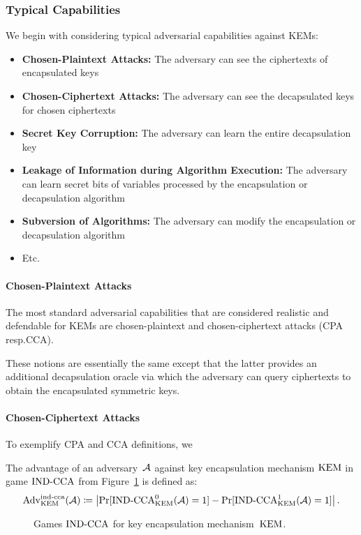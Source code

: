 \documentclass[a4paper,orivec]{llncs}
\begin{document}
\subsubsection{Typical Capabilities}
We begin with considering typical adversarial capabilities against KEMs:
\begin{itemize}
    \item \textbf{Chosen-Plaintext Attacks:}
    The adversary can see the ciphertexts of encapsulated keys
    \item \textbf{Chosen-Ciphertext Attacks:}
    The adversary can see the decapsulated keys for chosen ciphertexts
    \item \textbf{Secret Key Corruption:}
    The adversary can learn the entire decapsulation key
    \item \textbf{Leakage of Information during Algorithm Execution:}
    The adversary can learn secret bits of variables processed by the encapsulation or decapsulation algorithm
    \item \textbf{Subversion of Algorithms:}
    The adversary can modify the encapsulation or decapsulation algorithm
    \item Etc.
\end{itemize}

\paragraph{Chosen-Plaintext Attacks}
The most standard adversarial capabilities that are considered realistic and defendable for KEMs are chosen-plaintext and chosen-ciphertext attacks (CPA resp.\@ CCA).


These notions are essentially the same except that the latter provides an additional decapsulation oracle via which the adversary can query ciphertexts to obtain the encapsulated symmetric keys.



\paragraph{Chosen-Ciphertext Attacks}
To exemplify CPA and CCA definitions, we 

The advantage of an adversary~$\mathcal{A}$ against key encapsulation mechanism $\mathrm{KEM}$ in game ${\mathrm{IND}\text{-}\mathrm{CCA}}$ from Figure~\ref{fig:kem:ind} is defined as:
\[
\mathrm{Adv}_{\mathrm{KEM}}^{\mathrm{ind}\text{-}\mathrm{cca}}(\mathcal{A})\coloneqq\left|\Pr[{\mathrm{IND}\text{-}\mathrm{CCA}}_{\mathrm{KEM}}^0(\mathcal{A})=1]-\Pr[{\mathrm{IND}\text{-}\mathrm{CCA}}_{\mathrm{KEM}}^1(\mathcal{A})=1]\right|\text{.}
\]

\begin{figure}[!ht]
    \centering
    \nicoresetlinenr%
    \fbox{%
        \scalebox{\codescalefactor}{%
        }%
    }
    \caption{%
        Games ${\mathrm{IND}\text{-}\mathrm{CCA}}$ for key encapsulation mechanism~$\mathrm{KEM}$.
    }
    \label{fig:kem:ind}
\end{figure}
\end{document}
